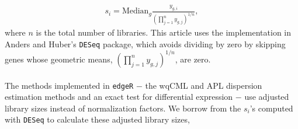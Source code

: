 \documentclass[10pt]{article}
\begin{document}
%
%
%


\begin{align*}
s_i = \text{Median}_g \frac{y_{g, i}}{ \left (\prod_{j = 1}^n y_{g, j} \right)^{1/n}},
\end{align*}
where $n$ is the total number of libraries. This article uses the implementation in Anders and Huber's {\tt DESeq} package, which avoids dividing by zero by skipping genes whose geometric means, $\left (\prod_{j = 1}^n y_{g, j} \right)^{1/n}$, are zero.

\paragraph{} \indent The methods implemented in {\tt edgeR} $-$ the wqCML and APL dispersion estimation methods and an exact test for differential expression $-$ use adjusted library sizes instead of normalization factors. We borrow from the $s_i$'s computed with {\tt DESeq} to calculate these adjusted library sizes,
\end{document}
